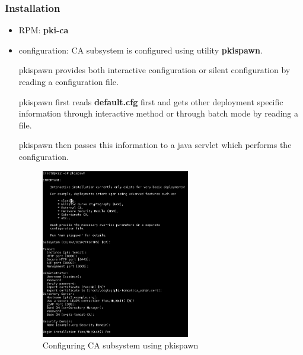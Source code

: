 \documentclass[12pt]{report}
\begin{document}
\subsubsection{Installation}
    \begin{itemize}
        \item RPM: \textrm{\textbf{pki-ca}}
        \item configuration:  CA subsystem is configured using utility \textbf{pkispawn}. 
            
            pkispawn provides both interactive configuration  or silent configuration by reading a configuration file. 
            
            pkispawn first reads \textbf{default.cfg} first and gets other deployment specific information through interactive method
            or through batch mode by reading a file. 

            pkispawn then passes this information to a java servlet which performs the configuration. 
        \begin{figure}[ht!]
            \centering
            \includegraphics[width=65mm]{Images/pkispawn-ca.png}
            \caption{Configuring CA subsystem using pkispawn}
        \end{figure}
    \end{itemize}
\end{document}
